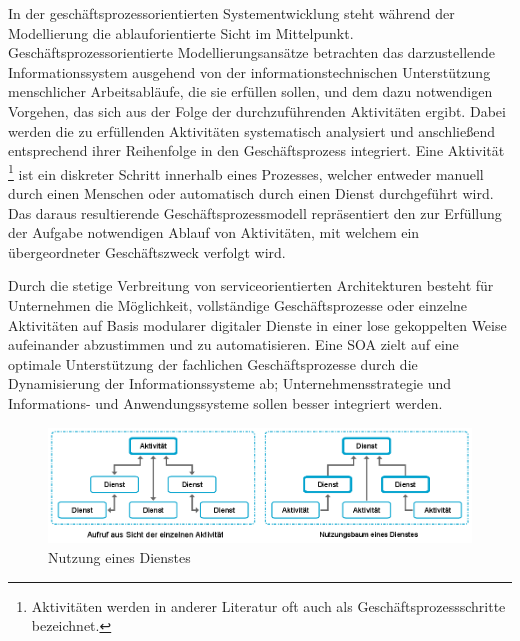 In der geschäftsprozessorientierten Systementwicklung steht während der Modellierung die ablauforientierte Sicht im Mittelpunkt.
Geschäftsprozessorientierte Modellierungsansätze betrachten das darzustellende Informationssystem ausgehend von der informationstechnischen Unterstützung menschlicher Arbeitsabläufe, die sie erfüllen sollen, und dem dazu notwendigen Vorgehen, das sich aus der Folge der durchzuführenden Aktivitäten ergibt.
\cite{Wolf.2016}
Dabei werden die zu erfüllenden Aktivitäten systematisch analysiert und anschließend entsprechend ihrer Reihenfolge in den Geschäftsprozess integriert.
Eine Aktivität \footnote{Aktivitäten werden in anderer Literatur oft auch als Geschäftsprozessschritte bezeichnet.} ist ein diskreter Schritt innerhalb eines Prozesses, welcher entweder manuell durch einen Menschen oder automatisch durch einen Dienst durchgeführt wird.
\cite{Benker.2016}
Das daraus resultierende Geschäftsprozessmodell repräsentiert den zur Erfüllung der Aufgabe notwendigen Ablauf von Aktivitäten, mit welchem ein übergeordneter Geschäftszweck verfolgt wird.

Durch die stetige Verbreitung von serviceorientierten Architekturen besteht für Unternehmen die Möglichkeit, vollständige Geschäftsprozesse oder einzelne Aktivitäten auf Basis modularer digitaler Dienste in einer lose gekoppelten Weise aufeinander abzustimmen und zu automatisieren. 
\cite{Masak.2007}
Eine \ac{SOA} zielt auf eine optimale Unterstützung der fachlichen Geschäftsprozesse durch die Dynamisierung der Informationssysteme ab; Unternehmensstrategie und Informations- und Anwendungssysteme sollen besser integriert werden.
\cite{Teusch.2016}

\begin{figure}[H]
	\centering 
    \includegraphics[width=\textwidth]{img/Serviceaufbau.png}	
    \caption[Nutzung eines Dienstes]
    {Nutzung eines Dienstes  \protect\footnotemark}
    \label{fig:Nutzung eines Dienstes}
\end{figure}

